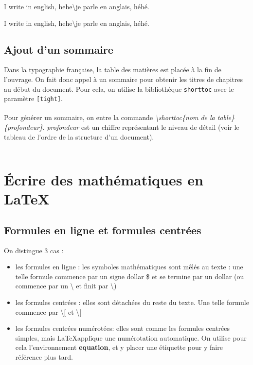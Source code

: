 \documentclass[a4paper, 10pt]{book}
\begin{document}
I write in english, hehe\textbackslash je parle en anglais, héhé.

I write in english, hehe\textbackslash je parle en anglais, héhé. \\ 
\section{Ajout d'un sommaire\\}	
Dans la typographie française, la table des matières est placée à la fin de l'ouvrage. On fait donc appel à un sommaire pour obtenir les titres de chapitres au début du document. Pour cela, on utilise la bibliothèque \texttt{shorttoc} avec le paramètre \texttt{[tight]}. \\\\
Pour générer un sommaire, on entre la commande \textit{\textbackslash shorttoc\{nom de la table\}\{profondeur\}}. \textit{profondeur} est un chiffre représentant le niveau de détail (voir le tableau de l'ordre de la structure d'un document).\\ \\

\chapter{\'Ecrire des mathématiques en LaTeX}
\section{Formules en ligne et formules centrées}

On distingue 3 cas : 

\begin{itemize}
\item les formules \textsf{en ligne} : les symboles mathématiques sont mêlés au texte : une telle formule commence par un signe dollar \textsf{\$} et se termine par un dollar (ou commence par un \textsf{\textbackslash} et finit par \textsf{\textbackslash}) 
\item les formules \textsf{centrées} : elles sont détachées du reste du texte. Une telle formule commence par \textsf{\textbackslash [} et \textsf{\textbackslash [}
\item les formules \textsf{centrées numérotées}: elles sont comme les formules centrées simples, mais \LaTeX applique une numérotation automatique. On utilise pour cela l'environnement \textbf{equation}, et y placer une étiquette pour y faire référence plus tard.
\end{itemize}
\end{document}
